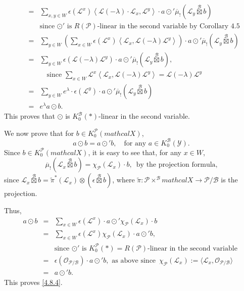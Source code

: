 \documentclass[10pt,a4paper]{amsart}
\def\B{\mathcal{B}}
\def\L{\mathcal{L}}
\def\P{\mathcal{P}}
\def\Y{\mathcal{Y}}
\def\ref#1{#1}
\newcommand{\X}{mathcal{X}}
\begin{document}
\begin{definition}
{\begin{eqnarray*}
&=& \sum_{x,y\in W}\epsilon \left(\L^x\right) \left\langle \L(-\lambda)\cdot \L_x,\L^y\right\rangle\cdot a \odot' \overline{\mu}_! \left( \L_y \overset{\B}{\boxtimes} b\right)\\
&&\text{since $\odot'$ is $R(\P)$-linear in the second variable by Corollary \ref{4.5}}\\
&=&\sum_{y\in W}\left( \sum_{x\in W} \epsilon \left(\L^x\right) \left\langle \L_x, \L\left(-\lambda\right)\L^y \right\rangle\right) \cdot a \odot' \overline{\mu}_! \left( \L_y \overset{\B}{\boxtimes} b\right)\\
&=&\sum_{y\in W} \epsilon\left(\L\left(-\lambda\right)\L^y\right)\cdot a \odot' \overline{\mu}_! \left( \L_y \overset{\B}{\boxtimes} b\right) ,\\
&&\quad\mbox{since }\sum_{x\in W}\L^x \left\langle \L_x, \L\left(-\lambda\right)\L^y \right\rangle = \L\left(-\lambda\right)\L^y\\
&=&\sum_{y\in W}e^\lambda \cdot \epsilon \left(\L^y\right) \cdot a \odot'  \overline{\mu}_! \left( \L_y \overset{\B}{\boxtimes} b\right)\\
&=&e^\lambda a \odot b.
\end{eqnarray*}
This proves that $\odot$ is $K_0^\B(*)$-linear in the second variable. 

We now prove that for $b\in K_0^\P(\X)$, 
\begin{equation}\label{4.8.4}
a\odot b= a\odot' b, \quad \mbox{for any } a\in K_0^\B \left(\Y\right).
\end{equation}
Since $b\in K_0^\P(\X)$, it is easy to see that, for any $x\in W$, 
$$
 \overline{\mu}_! \left( \L_x\overset{\B}{\boxtimes} b\right)= \chi_\P\left(\L_x\right)\cdot b,\,\,\,\text{by the projection formula,}
 $$ since $\L_x\overset{\B}{\boxtimes} b=\tilde{\pi}^* \left(\L_x\right)\otimes \left(\epsilon \overset{\B}{\boxtimes} b\right)$, where $\tilde{\pi}: \P\times^\B \X \rightarrow \P/\B$ is the projection. 
 
 Thus, 
\begin{eqnarray*}
a\odot b &=&  \sum_{x\in W} \epsilon \left(\L^x\right) \cdot a \odot' \chi_\P\left(\L_x\right)\cdot b\\
&=& \sum_{x\in W} \epsilon \left(\L^x\right) \chi_\P\left(\L_x\right)\cdot a \odot' b,\\
&& \mbox{since $\odot'$ is $K_0^\P(*)=R(\P)$-linear in the second variable }\\
&=&\epsilon \left(\mathcal{O}_{\P/\B}\right)\cdot a \odot' b,\mbox{ as above since } \,\chi_\P(\L_x) :=\langle \L_x, \mathcal{O}_{\P/\B}\rangle\\
&=&a \odot' b.
\end{eqnarray*}
This proves \eqref{4.8.4}. 


}
\end{definition}
\end{document}
